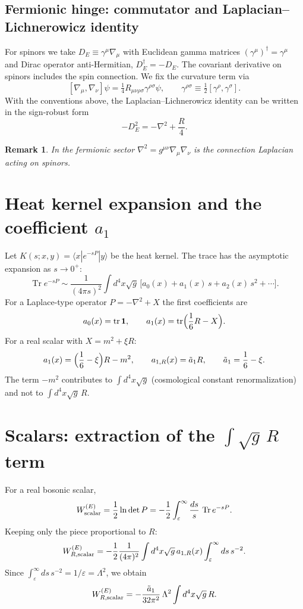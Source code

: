 \documentclass[11pt]{article}
\newtheorem{remark}{Remark}
\newcommand{\tr}{\operatorname{tr}}
\newcommand{\Tr}{\operatorname{Tr}}
\begin{document}
\subsection{Fermionic hinge: commutator and Laplacian--Lichnerowicz identity}
For spinors we take $D_E \equiv \gamma^\mu \nabla_\mu$ with Euclidean gamma
matrices $(\gamma^\mu)^\dagger = \gamma^\mu$ and Dirac operator
anti-Hermitian, $D_E^\dagger = -D_E$. The covariant derivative on spinors
includes the spin connection. We fix the curvature term via
\[
[\nabla_\mu, \nabla_\nu]\psi = \tfrac{1}{4} R_{\mu\nu\rho\sigma}
\gamma^{\rho\sigma}\psi,
\qquad
\gamma^{\rho\sigma} \equiv \tfrac{1}{2}[\gamma^\rho, \gamma^\sigma].
\]
With the conventions above, the Laplacian--Lichnerowicz identity can be
written in the sign-robust form
\begin{equation}
-D_E^2 = -\nabla^2 + \frac{R}{4}.
\label{eq:lichnerowicz}
\end{equation}
\begin{remark}
In the fermionic sector $\nabla^2 = g^{\mu\nu}\nabla_\mu\nabla_\nu$ is the
connection Laplacian acting on spinors.
\end{remark}

\section{Heat kernel expansion and the coefficient $a_1$}
Let $K(s;x,y) = \langle x| e^{-sP} |y\rangle$ be the heat kernel. The trace
has the asymptotic expansion as $s \to 0^+$:
\begin{equation}
\Tr e^{-sP} \sim \frac{1}{(4\pi s)^2} \int d^4x \sqrt{g}\,
\bigl[ a_0(x) + a_1(x)\, s + a_2(x)\, s^2 + \cdots \bigr].
\label{eq:hk}
\end{equation}
For a Laplace-type operator $P = -\nabla^2 + X$ the first coefficients are
\begin{equation}
a_0(x) = \tr \mathbf{1},
\qquad
a_1(x) = \tr\Bigl( \frac{1}{6} R - X \Bigr).
\label{eq:a1}
\end{equation}
For a real scalar with $X = m^2 + \xi R$:
\[
a_1(x) = \Bigl( \frac{1}{6} - \xi \Bigr) R - m^2,
\qquad
a_{1,R}(x) = \tilde a_1 R,
\qquad
\tilde a_1 = \frac{1}{6} - \xi.
\]
The term $-m^2$ contributes to $\int d^4x\sqrt{g}$ (cosmological constant
renormalization) and not to $\int d^4x \sqrt{g}\, R$.

\section{Scalars: extraction of the $\int \sqrt{g}\,R$ term}
For a real bosonic scalar,
\[
W^{(E)}_{\rm scalar} = \frac{1}{2}\ln\det P
= -\frac{1}{2}\int_\varepsilon^\infty \frac{ds}{s}\,\Tr e^{-sP}.
\]
Keeping only the piece proportional to $R$:
\[
W^{(E)}_{R,\rm scalar} = -\frac{1}{2}\frac{1}{(4\pi)^2}
\int d^4x \sqrt{g}\, a_{1,R}(x) \int_\varepsilon^\infty ds\, s^{-2}.
\]
Since $\int_\varepsilon^\infty ds\, s^{-2} = 1/\varepsilon = \Lambda^2$, we
obtain
\begin{equation}
W^{(E)}_{R,\rm scalar} = -\frac{\tilde a_1}{32\pi^2}\,\Lambda^2
\int d^4x \sqrt{g}\, R.
\label{eq:Wscalar}
\end{equation}
\end{document}
